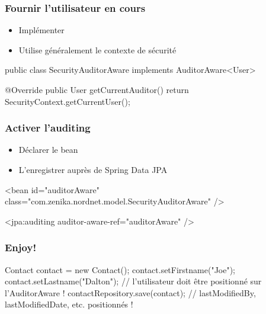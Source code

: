 \begin{frame}[fragile]
 \frametitle{Fournir l'utilisateur en cours}

 \begin{itemize}
  \item Implémenter 
  \item Utilise généralement le contexte de sécurité
 \end{itemize}

 \begin{javacode}
public class SecurityAuditorAware implements AuditorAware<User> {

  @Override
  public User getCurrentAuditor() {
    return SecurityContext.getCurrentUser();
  }

}
 \end{javacode}
\end{frame}

\begin{frame}[fragile]
 \frametitle{Activer l'auditing}

 \begin{itemize}
  \item Déclarer le bean 
  \item L'enregistrer auprès de Spring Data JPA
 \end{itemize}

 \begin{xmlcode}
<bean id="auditorAware" 
      class="com.zenika.nordnet.model.SecurityAuditorAware" />

<jpa:auditing auditor-aware-ref="auditorAware" />
 \end{xmlcode}
\end{frame}

\begin{frame}[fragile]
 \frametitle{Enjoy!}

 \begin{javacode}
Contact contact = new Contact();
contact.setFirstname("Joe");
contact.setLastname("Dalton");
// l'utilisateur doit \^etre positionn\'e sur l'AuditorAware !
contactRepository.save(contact);
// lastModifiedBy, lastModifiedDate, etc. positionn\'es !
 \end{javacode}
\end{frame}